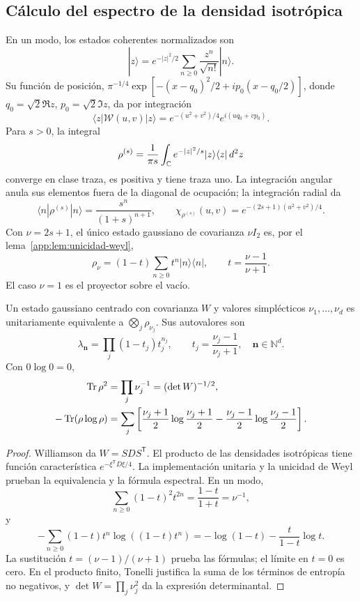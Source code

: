 \subsection{Cálculo del espectro de la densidad isotrópica}
En un modo, los estados coherentes normalizados son
\[
 |z\rangle=e^{-|z|^2/2}\sum_{n\geq0}\frac{z^n}{\sqrt{n!}}|n\rangle.
\]
Su función de posición,
\(\pi^{-1/4}\exp[-(x-q_0)^2/2+ip_0(x-q_0/2)]\), donde
\(q_0=\sqrt2\Re z\), \(p_0=\sqrt2\Im z\), da por integración
\[
 \langle z|\mathcal W(u,v)|z\rangle
 =e^{-(u^2+v^2)/4}e^{i(uq_0+vp_0)}.
\]
Para \(s>0\), la integral
\[
 \rho^{(s)}=\frac1{\pi s}\int_{\mathbb C} e^{-|z|^2/s}
 |z\rangle\langle z|\,d^2z
\]
converge en clase traza, es positiva y tiene traza uno. La integración
angular anula sus elementos fuera de la diagonal de ocupación; la
integración radial da
\[
 \langle n|\rho^{(s)}|n\rangle=\frac{s^n}{(1+s)^{n+1}},\qquad
 \chi_{\rho^{(s)}}(u,v)=e^{-(2s+1)(u^2+v^2)/4}.
\]
Con \(\nu=2s+1\), el único estado gaussiano de covarianza
\(\nu I_2\) es, por el lema~\ref{app:lem:unicidad-weyl},
\begin{equation}
 \rho_\nu=(1-t)\sum_{n\geq0}t^n|n\rangle\langle n|,
 \qquad t=\frac{\nu-1}{\nu+1}.
 \label{app:eq:estado-geometrico}
\end{equation}
El caso \(\nu=1\) es el proyector sobre el vacío.

\begin{theorem}
\label{app:thm:espectro-gaussiano}
Un estado gaussiano centrado con covarianza \(W\) y valores
simplécticos \(\nu_1,\ldots,\nu_d\) es unitariamente equivalente
a \(\bigotimes_j\rho_{\nu_j}\). Sus autovalores son
\[
 \lambda_{\symbf{n}}=\prod_j(1-t_j)t_j^{n_j},\qquad
 t_j=\frac{\nu_j-1}{\nu_j+1},\quad \symbf{n}\in\mathbb N^d.
\]
Con \(0\log0=0\),
\begin{align}
 \operatorname{Tr}\rho^2&=\prod_j\nu_j^{-1}=(\det W)^{-1/2},
 \label{app:eq:pureza-general}\\
 -\operatorname{Tr}(\rho\log\rho)&=\sum_j
 \left[\frac{\nu_j+1}{2}\log\frac{\nu_j+1}{2}
 -\frac{\nu_j-1}{2}\log\frac{\nu_j-1}{2}\right].
 \label{app:eq:entropia-general}
\end{align}
\end{theorem}
\begin{proof}
Williamson da \(W=SDS^{\mathsf T}\). El producto de las densidades
isotrópicas tiene función característica \(e^{-\xi^{\mathsf T}D\xi/4}\).
La implementación unitaria y la unicidad de Weyl prueban la
equivalencia y la fórmula espectral. En un modo,
\[
 \sum_{n\geq0}(1-t)^2t^{2n}=\frac{1-t}{1+t}=\nu^{-1},
\]
y
\[
 -\sum_{n\geq0}(1-t)t^n\log((1-t)t^n)
 =-\log(1-t)-\frac{t}{1-t}\log t.
\]
La sustitución \(t=(\nu-1)/(\nu+1)\) prueba las fórmulas; el
límite en \(t=0\) es cero. En el producto finito, Tonelli justifica
la suma de los términos de entropía no negativos, y
\(\det W=\prod_j\nu_j^2\) da la expresión determinantal.
\end{proof}

